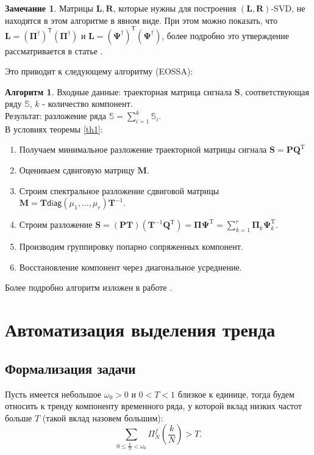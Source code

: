 \documentclass[specialist, substylefile = spbureport.rtx, subf,href,colorlinks=true, 12pt]{disser}
\theoremstyle{definition}
\newtheorem{algorithm}{Алгоритм}
\newtheorem{remark}{Замечание}
\begin{document}
\begin{remark}
    Матрицы $\mathbf{L}, \mathbf{R}$, которые нужны для построения $(\mathbf{L}, \mathbf{R})$-SVD, не находятся в этом алгоритме в явном виде. При этом можно показать, что $\mathbf{L} = (\mathbf{\Pi}^{\dag})^{\mathsf{T}}(\mathbf{\Pi}^{\dag})$ и $\mathbf{L} = (\mathbf{\Psi}^{\dag})^{\mathsf{T}}(\mathbf{\Psi}^{\dag})$, более подробно это утверждение рассматривается в статье \cite{Golyandina15}.
\end{remark}
Это приводит к следующему алгоритму (EOSSA):
\begin{algorithm} 
Входные данные: траекторная матрица сигнала $\mathbf{S}$, соответствующая ряду $\mathbb{S}$, $k$ - количество компонент.\\
Результат: разложение ряда $\mathbb{S} = \sum_{i = 1}^{k}\mathbb{S}_i$.\\
В условиях теоремы \ref{th1}:
\label{alg4}
    \begin{enumerate}
            \item Получаем минимальное разложение траекторной матрицы сигнала $\mathbf{S} = \mathbf{PQ}^{\mathrm{T}}$
            \item Оцениваем сдвиговую матрицу $\mathbf{M}$.
            \item Строим спектральное разложение сдвиговой матрицы $\mathbf{M} = \mathbf{T}\mathsf{diag}(\mu_1, ..., \mu_r)\mathbf{T}^{-1}$.
            \item Строим разложение $\mathbf{S} = (\mathbf{PT})(\mathbf{T}^{-1}\mathbf{Q}^{\mathrm{T}}) = \mathbf{\Pi \Psi}^{\mathrm{T}} = \sum_{k = 1}^{r}\mathbf{\Pi}_k\mathbf{\Psi}^{\mathrm{T}}_k$.
            \item Производим группировку попарно сопряженных компонент.
            \item Восстановление компонент через диагональное усреднение. 
        \end{enumerate}
\end{algorithm}
Более подробно алгоритм изложен в работе \cite{Shlemov}.
    
    
    
    
\chapter{Автоматизация выделения тренда}
\section{Формализация задачи}
Пусть имеется небольшое $\omega_0 > 0$ и $0 < T < 1$ близкое к единице, тогда будем относить к тренду компоненту временного ряда, у которой вклад низких частот больше $T$ (такой вклад назовем большим):
\begin{equation*}
    \sum\limits_{0 \leq \frac{k}{N} < \omega_0}\Pi_N^f(\frac{k}{N}) > T.
\end{equation*}
\end{document}
